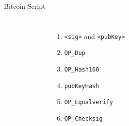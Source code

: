 \documentclass[]{beamer}
\begin{document}
\begin{frame}{Bitcoin Script}
\begin{columns}
\begin{figure}
	
\end{figure}
\begin{enumerate}
\item<1-> \texttt{<sig>} and \texttt{<pubKey>}
\item<2-> \texttt{OP\_Dup}
\item<6-> \texttt{OP\_Hash160}
\item<10-> \texttt{pubKeyHash}
\item<11-> \texttt{OP\_Equalverify}
\item<14-> \texttt{OP\_Checksig}
\end{enumerate}
\end{columns}
\end{frame}
\end{document}

